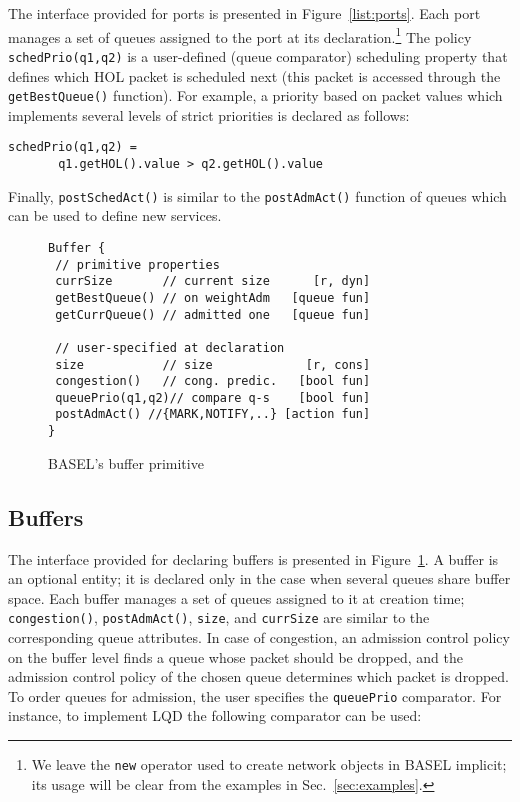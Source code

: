 \documentclass{article}
\newcommand{\barch}{BASEL}
\begin{document}
The interface provided for ports is presented in Figure~\ref{list:ports}.
Each port manages a set of queues assigned to the port at its declaration.\footnote{We leave the \lstinline{new}
operator used to create network objects in \barch{} implicit; its usage will be clear from the examples in Sec.~\ref{sec:examples}.}
The policy \lstinline|schedPrio(q1,q2)| is a user-defined (queue comparator) scheduling property that defines which HOL packet is scheduled next (this packet is accessed through the \lstinline|getBestQueue()| function). 
For example, a priority based on packet values which implements several levels of strict priorities is declared as follows:



\begin{lstlisting}[basicstyle=\tt\footnotesize]
schedPrio(q1,q2) = 
       q1.getHOL().value > q2.getHOL().value
\end{lstlisting}




Finally, \lstinline|postSchedAct()| is similar to the \lstinline|postAdmAct()| function of queues which can be used to define new services.








\begin{figure}[t!]
  \centering
 \begin{minipage}{.9\linewidth}
\begin{lstlisting}[frame=tb,basicstyle=\ttfamily\small,belowskip=0em]
Buffer {
 // primitive properties
 currSize       // current size      [r, dyn]
 getBestQueue() // on weightAdm   [queue fun]
 getCurrQueue() // admitted one   [queue fun]
   
 // user-specified at declaration
 size           // size             [r, cons]
 congestion()   // cong. predic.   [bool fun]
 queuePrio(q1,q2)// compare q-s    [bool fun]
 postAdmAct() //{MARK,NOTIFY,..} [action fun]
}
\end{lstlisting}
      \caption{\barch{}'s buffer primitive}\label{list:buffers}
  \end{minipage}
\end{figure}

\subsection{Buffers}
 The interface provided for declaring buffers is presented in Figure~\ref{list:buffers}.
A buffer is an optional entity; it is declared only in the case when several queues share buffer space. Each buffer manages a set of queues assigned to it at creation time; \lstinline|congestion()|, \lstinline|postAdmAct()|, \lstinline|size|, and \lstinline|currSize| are similar to the corresponding queue attributes. In case of congestion, an admission control policy on the buffer level finds a queue whose packet should be dropped, and the admission control policy of the chosen queue determines which packet is dropped. To order queues for admission, the user specifies the \lstinline|queuePrio| comparator. For instance, to implement LQD the following comparator can be used:
\end{document}
